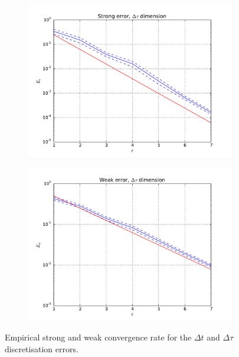 \documentclass[11pt]{amsart}
\begin{document}
\begin{figure}
\begin{subfigure}[b]{0.4\textwidth}
        \label{fig:tiger}
    \end{subfigure}
    \\
    ~ %
    \begin{subfigure}[b]{0.4\textwidth}
        \includegraphics[width=\textwidth]{dim_2_strong.pdf}
        \label{fig:mouse}
    \end{subfigure}
        \begin{subfigure}[b]{0.4\textwidth}
        \includegraphics[width=\textwidth]{dim_2_weak.pdf}
        \label{fig:mouse}
    \end{subfigure}
    \caption{\label{fig:empInfDimRates}Empirical strong and weak convergence rate for the $\Delta t$ and $\Delta \tau$ discretisation errors.}
\end{figure}






\appendix
\end{document}

